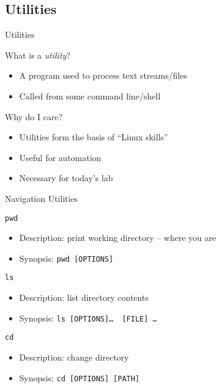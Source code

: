 \documentclass[table,dvipsnames]{beamer}
\begin{document}
\subsection{Utilities}
\begin{frame}{Utilities}
	\begin{block}{What is a \emph{utility}?}
		\begin{itemize}
			\item A program used to process text streams/files
			\item Called from some command line/shell
		\end{itemize}
	\end{block}
	\begin{block}{Why do I care?}
		\begin{itemize}
			\item Utilities form the basis of ``Linux skills''
			\item Useful for automation
			\item Necessary for today's lab
		\end{itemize}
	\end{block}
\end{frame}


\begin{frame}{Navigation Utilities}
	\begin{block}{\texttt{pwd}}
		\begin{itemize}
			\item Description: print working directory -- where you are
			\item Synopsis: \texttt{pwd [OPTIONS]}
		\end{itemize}
	\end{block}
	\begin{block}{\texttt{ls}}
		\begin{itemize}
			\item Description: list directory contents
			\item Synopsis: \texttt{ls [OPTIONS]\dots~ [FILE] \dots}
		\end{itemize}
	\end{block}
	\begin{block}{\texttt{cd}}
		\begin{itemize}
			\item Description: change directory
			\item Synopsis: \texttt{cd [OPTIONS] [PATH]}
		\end{itemize}
	\end{block}
\end{frame}
\end{document}

